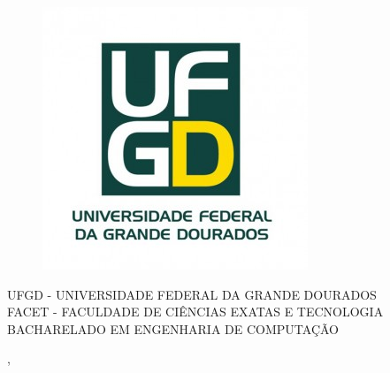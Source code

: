   \begin{capa}%
    \begin{figure}[h!]%
        \centering%
        \includegraphics[scale=0.4]{figs/logo_ufgd.jpg}%
      \end{figure}%
    \center
	\ABNTEXchapterfont\large    {\large UFGD - UNIVERSIDADE FEDERAL DA GRANDE DOURADOS} \\
    
    {\large FACET - FACULDADE DE CIÊNCIAS EXATAS E TECNOLOGIA}  \\ 

    {\large BACHARELADO EM ENGENHARIA DE COMPUTAÇÃO}  \\ 

    \vfill
    \ABNTEXchapterfont\bfseries\LARGE\imprimirtitulo
    \vfill

	\ABNTEXchapterfont\large\imprimirautor
	\vfill
%
    \large\imprimirlocal, \large\imprimirdata

    \vspace*{1cm}
  \end{capa}
